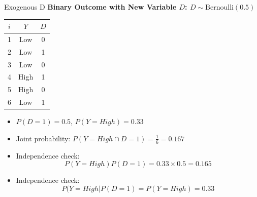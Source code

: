 \documentclass[xcolor=svgnames,t]{beamer}
\begin{document}
\begin{frame}{Exogenous D}
    \textbf{Binary Outcome with New Variable \( D \): \( D \sim \text{Bernoulli}(0.5) \)}
    
    \centering
    \begin{table}[]
    \begin{tabular}{|c|c|c|}
    \hline
    \( i \) & \( Y \) & \( D \) \\ \hline
    1 & Low  & 0 \\ \hline
    2 & Low  & 1 \\ \hline
    3 & Low  & 0 \\ \hline
    \rowcolor{blue!20} 4 & High & 1 \\ \hline
    5 & High & 0 \\ \hline
    6 & Low  & 1 \\ \hline
    \end{tabular}
    \end{table}

    \small{
    \begin{itemize}
      \item \( P(D = 1) = 0.5 \), \( P(Y = High) = 0.33 \)
      \item Joint probability: \( P(Y = High \cap D = 1) = \frac{1}{6} = 0.167 \)
      \item Independence check: 
      \[
      P(Y = High)P(D = 1) = 0.33 \times 0.5 = 0.165
      \]
      \item Independence check: 
      \[
      P(Y = High|P(D = 1) =   P(Y = High) = 0.33
      \]
    \end{itemize}
    }
\end{frame}
\end{document}
